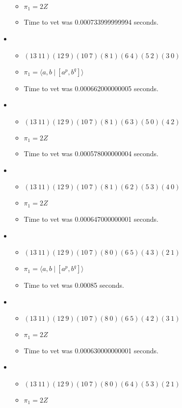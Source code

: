 \documentclass{article}
\begin{document}
\begin{itemize}
\begin{itemize}
      \item $\pi_1 =2 Z$
      \item Time to vet was 0.000733999999994 seconds.
\end{itemize}
\item \begin{itemize}
      \item $(13\ 11)(12\ 9)(10\ 7)(8\ 1)(6\ 4)(5\ 2)(3\ 0)$
      \item $\pi_1 = \langle a,b\ |\ [a^p,b^q]\rangle$
      \item Time to vet was 0.000662000000005 seconds.
\end{itemize}
\item \begin{itemize}
      \item $(13\ 11)(12\ 9)(10\ 7)(8\ 1)(6\ 3)(5\ 0)(4\ 2)$
      \item $\pi_1 =2 Z$
      \item Time to vet was 0.000578000000004 seconds.
\end{itemize}
\item \begin{itemize}
      \item $(13\ 11)(12\ 9)(10\ 7)(8\ 1)(6\ 2)(5\ 3)(4\ 0)$
      \item $\pi_1 =2 Z$
      \item Time to vet was 0.000647000000001 seconds.
\end{itemize}
\item \begin{itemize}
      \item $(13\ 11)(12\ 9)(10\ 7)(8\ 0)(6\ 5)(4\ 3)(2\ 1)$
      \item $\pi_1 = \langle a,b\ |\ [a^p,b^q]\rangle$
      \item Time to vet was 0.00085 seconds.
\end{itemize}
\item \begin{itemize}
      \item $(13\ 11)(12\ 9)(10\ 7)(8\ 0)(6\ 5)(4\ 2)(3\ 1)$
      \item $\pi_1 =2 Z$
      \item Time to vet was 0.000630000000001 seconds.
\end{itemize}
\item \begin{itemize}
      \item $(13\ 11)(12\ 9)(10\ 7)(8\ 0)(6\ 4)(5\ 3)(2\ 1)$
      \item $\pi_1 =2 Z$

\end{itemize}
\end{itemize}
\end{document}
